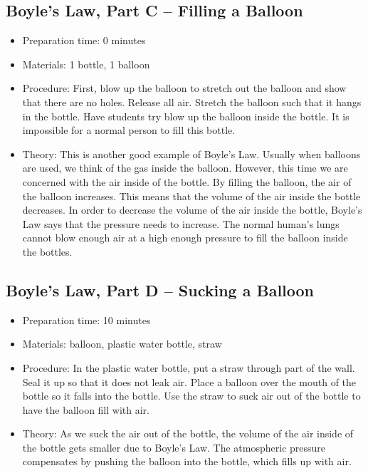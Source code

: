 \subsection{Boyle’s Law, Part C – Filling a Balloon}
\begin{itemize}
\item{Preparation time: 0 minutes}
\item{Materials: 1 bottle, 1 balloon}
\item{Procedure: First, blow up the balloon to stretch out the balloon and show that there are no holes. Release all air. Stretch the balloon such that it hangs in the bottle. Have students try blow up the balloon inside the bottle. It is impossible for a normal person to fill this bottle.}
\item{Theory: This is another good example of Boyle’s Law. Usually when balloons are used, we think of the gas inside the balloon. However, this time we are concerned with the air inside of the bottle. By filling the balloon, the air of the balloon increases. This means that the volume of the air inside the bottle decreases. In order to decrease the volume of the air inside the bottle, Boyle’s Law says that the pressure needs to increase. The normal human’s lungs cannot blow enough air at a high enough pressure to fill the balloon inside the bottles. }
\end{itemize}

\subsection{Boyle’s Law, Part D – Sucking a Balloon}
\begin{itemize}
\item{Preparation time: 10 minutes}
\item{Materials: balloon, plastic water bottle, straw}
\item{Procedure: In the plastic water bottle, put a straw through part of the wall. Seal it up so that it does not leak air. Place a balloon over the mouth of the bottle so it falls into the bottle. Use the straw to suck air out of the bottle to have the balloon fill with air.}
\item{Theory: As we suck the air out of the bottle, the volume of the air inside of the bottle gets smaller due to Boyle’s Law. The atmospheric pressure compensates by pushing the balloon into the bottle, which fills up with air.}
\end{itemize}

